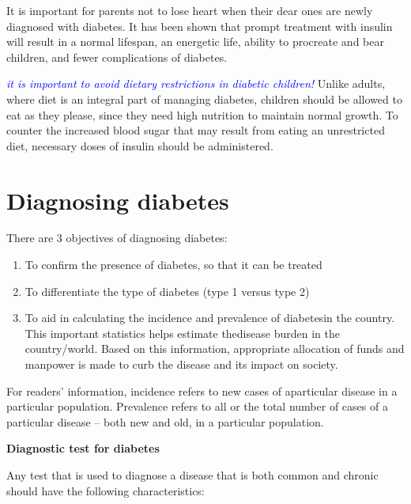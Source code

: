 It is important for parents not to lose heart when their dear ones are newly diagnosed with diabetes. It has been shown that prompt treatment with insulin will result in a normal lifespan, an energetic life, ability to procreate and bear children, and fewer complications of diabetes.

\textcolor{blue}{\textit{it is important to avoid dietary restrictions in diabetic children!}} Unlike adults, where diet is an integral part of managing diabetes, children should be allowed to eat as they please, since they need high nutrition to maintain normal growth. To counter the increased blood sugar that may result from eating an unrestricted diet, necessary doses of insulin should be administered.



\chapter{Diagnosing diabetes}\label{chap5}

There are 3 objectives of diagnosing diabetes:

\vspace{-\topsep}
\begin{enumerate}
\itemsep=0pt
\item To confirm the presence of diabetes, so that it can be treated
\item To differentiate the type of diabetes (type 1 versus type 2)
\item To aid in calculating the incidence and prevalence of diabetes\break in the country. This important statistics helps estimate the\break disease burden in the country/world. Based on this information, appropriate allocation of funds and manpower is made to curb the disease and its impact on society.
\end{enumerate}
\vspace{-\topsep}

For readers’ information, incidence refers to new cases of a\break parti\-cular disease in a particular population. Prevalence refers to all or the total number of cases of a particular disease – both new and old, in a particular population.

\noindent
\textbf{Diagnostic test for diabetes}

Any test that is used to diagnose a disease that is both common and chronic should have the following characteristics:

